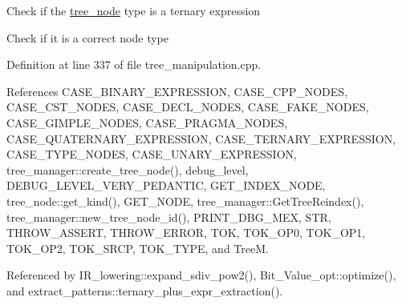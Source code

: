 Check if the \hyperlink{classtree__node}{tree\+\_\+node} type is a ternary expression

Check if it is a correct node type 

Definition at line 337 of file tree\+\_\+manipulation.\+cpp.



References C\+A\+S\+E\+\_\+\+B\+I\+N\+A\+R\+Y\+\_\+\+E\+X\+P\+R\+E\+S\+S\+I\+ON, C\+A\+S\+E\+\_\+\+C\+P\+P\+\_\+\+N\+O\+D\+ES, C\+A\+S\+E\+\_\+\+C\+S\+T\+\_\+\+N\+O\+D\+ES, C\+A\+S\+E\+\_\+\+D\+E\+C\+L\+\_\+\+N\+O\+D\+ES, C\+A\+S\+E\+\_\+\+F\+A\+K\+E\+\_\+\+N\+O\+D\+ES, C\+A\+S\+E\+\_\+\+G\+I\+M\+P\+L\+E\+\_\+\+N\+O\+D\+ES, C\+A\+S\+E\+\_\+\+P\+R\+A\+G\+M\+A\+\_\+\+N\+O\+D\+ES, C\+A\+S\+E\+\_\+\+Q\+U\+A\+T\+E\+R\+N\+A\+R\+Y\+\_\+\+E\+X\+P\+R\+E\+S\+S\+I\+ON, C\+A\+S\+E\+\_\+\+T\+E\+R\+N\+A\+R\+Y\+\_\+\+E\+X\+P\+R\+E\+S\+S\+I\+ON, C\+A\+S\+E\+\_\+\+T\+Y\+P\+E\+\_\+\+N\+O\+D\+ES, C\+A\+S\+E\+\_\+\+U\+N\+A\+R\+Y\+\_\+\+E\+X\+P\+R\+E\+S\+S\+I\+ON, tree\+\_\+manager\+::create\+\_\+tree\+\_\+node(), debug\+\_\+level, D\+E\+B\+U\+G\+\_\+\+L\+E\+V\+E\+L\+\_\+\+V\+E\+R\+Y\+\_\+\+P\+E\+D\+A\+N\+T\+IC, G\+E\+T\+\_\+\+I\+N\+D\+E\+X\+\_\+\+N\+O\+DE, tree\+\_\+node\+::get\+\_\+kind(), G\+E\+T\+\_\+\+N\+O\+DE, tree\+\_\+manager\+::\+Get\+Tree\+Reindex(), tree\+\_\+manager\+::new\+\_\+tree\+\_\+node\+\_\+id(), P\+R\+I\+N\+T\+\_\+\+D\+B\+G\+\_\+\+M\+EX, S\+TR, T\+H\+R\+O\+W\+\_\+\+A\+S\+S\+E\+RT, T\+H\+R\+O\+W\+\_\+\+E\+R\+R\+OR, T\+OK, T\+O\+K\+\_\+\+O\+P0, T\+O\+K\+\_\+\+O\+P1, T\+O\+K\+\_\+\+O\+P2, T\+O\+K\+\_\+\+S\+R\+CP, T\+O\+K\+\_\+\+T\+Y\+PE, and TreeM.



Referenced by I\+R\+\_\+lowering\+::expand\+\_\+sdiv\+\_\+pow2(), Bit\+\_\+\+Value\+\_\+opt\+::optimize(), and extract\+\_\+patterns\+::ternary\+\_\+plus\+\_\+expr\+\_\+extraction().

